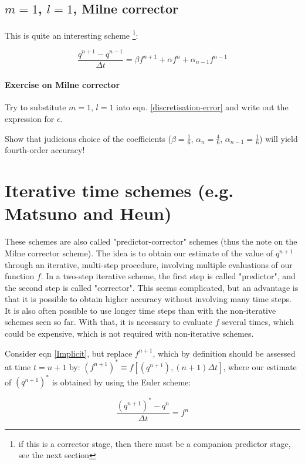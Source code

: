 \subsection{$m=1$, $l=1$, Milne corrector}

This is quite an interesting scheme \footnote{if this is a corrector stage, then there must be a companion predictor stage, see the next section}:

\begin{equation}
	\frac{q^{n+1}-q^{n-1}}{\Delta t} = \beta f^{n+1} + \alpha f^n + \alpha_{n-1} f^{n-1}
	\label{Milne-corrector}
\end{equation}

\paragraph{Exercise on Milne corrector}
Try to substitute $m=1$, $l=1$ into eqn. \ref{discretisation-error} and write out the expression for $\epsilon$.

Show that judicious choice of the coefficients ($\beta = \frac{1}{6}$, $\alpha_n = \frac{4}{6}$, $\alpha_{n-1} = \frac{1}{6}$) will yield fourth-order accuracy!
	
\section{Iterative time schemes (e.g. Matsuno and Heun)}
These schemes are also called "predictor-corrector" schemes (thus the note on the Milne corrector scheme). The idea is to obtain our estimate of the value of $q^{n+1}$ through an iterative, multi-step procedure, involving multiple evaluations of our function $f$. In a two-step iterative scheme, the first step is called "predictor", and the second step is called "corrector". This seems complicated, but an advantage is that it is possible to obtain higher accuracy without involving many time steps. It is also often possible to use longer time steps than with the non-iterative schemes seen so far. With that, it is necessary to evaluate $f$ several times, which could be expensive, which is not required with non-iterative schemes.


Consider eqn \ref{Implicit}, but replace $f^{n+1}$, which by definition should be assessed at time $t=n+1$ by: $\left(f^{n+1}\right)^* \equiv f \left[\left(q^{n+1}\right),\left(n+1\right)\Delta t\right]$, where our estimate of $\left(q^{n+1}\right)^*$ is obtained by using the Euler scheme:

\begin{equation}
	 \frac{ (q^{n+1})^*-q^n}{\Delta t} = f^n
	\label{Euler-predictor}
\end{equation}

